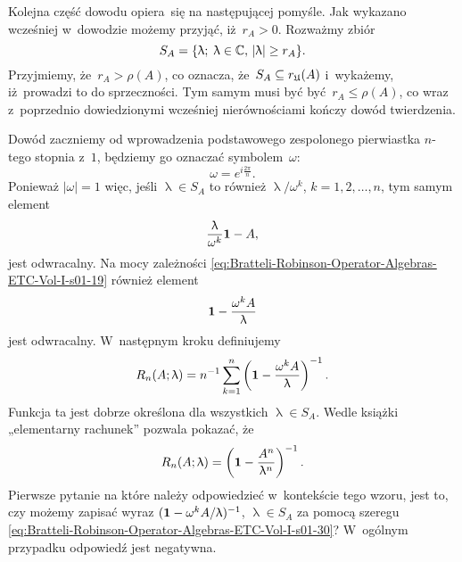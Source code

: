 \documentclass[a4paper,11pt]{article}
\renewcommand{\lambda}{\uplambda}
\begin{document}
Kolejna część dowodu opiera~się na następującej pomyśle. Jak wykazano
wcześniej w~dowodzie możemy przyjąć, iż~$r_{ A } > 0$. Rozważmy zbiór
\begin{equation}
  \label{eq:Bratteli-Robinson-Operator-Algebras-ETC-Vol-I-s01-46}
  S_{ A } =
  \{ \lambda; \; \lambda \in \Cbb, \, | \lambda | \geq r_{ A } \}.
\end{equation}
Przyjmiemy, że~$r_{ A } > \rho( A )$, co oznacza, że~$S_{ A } \subseteq r_{ \mathfrak{U} }( A )$
i~wykażemy, iż~prowadzi to do sprzeczności. Tym samym musi być
być~$r_{ A } \leq \rho( A )$, co wraz z~poprzednio dowiedzionymi wcześniej
nierównościami kończy dowód twierdzenia.

Dowód zaczniemy od wprowadzenia podstawowego zespolonego pierwiastka
$n$-tego stopnia z~$1$, będziemy go oznaczać symbolem~$\omega$:
\begin{equation}
  \label{eq:Bratteli-Robinson-Operator-Algebras-ETC-Vol-I-s01-47}
  \omega = e^{ i \frac{ 2 \pi }{ n } }.
\end{equation}
Ponieważ $| \omega | = 1$ więc, jeśli $\lambda \in S_{ A }$ to również
$\lambda / \omega^{ k }$, $k = 1, 2, \ldots, n$, tym samym element
\begin{equation}
  \label{eq:Bratteli-Robinson-Operator-Algebras-ETC-Vol-I-s01-48}
  \frac{ \lambda }{ \omega^{ k } } \UnitAlg - A,
\end{equation}
jest odwracalny. Na mocy zależności
\eqref{eq:Bratteli-Robinson-Operator-Algebras-ETC-Vol-I-s01-19} również
element
\begin{equation}
  \label{eq:Bratteli-Robinson-Operator-Algebras-ETC-Vol-I-s01-49}
  \UnitAlg - \frac{ \omega^{ k } A }{ \lambda }
\end{equation}
jest odwracalny. W~następnym kroku definiujemy
\begin{equation}
  \label{eq:Bratteli-Robinson-Operator-Algebras-ETC-Vol-I-s01-50}
  R_{ n }( A; \lambda ) =
  n^{ -1 } \sum_{ k = 1 }^{ n } \left( \UnitAlg -
    \frac{ \omega^{ k } A }{ \lambda } \right)^{ -1 }.
\end{equation}
Funkcja ta jest dobrze określona dla wszystkich $\lambda \in S_{ A }$. Wedle książki
„elementarny rachunek” pozwala pokazać, że
\begin{equation}
  \label{eq:Bratteli-Robinson-Operator-Algebras-ETC-Vol-I-s01-51}
  R_{ n }( A; \lambda ) =
  \left( \UnitAlg - \frac{ A^{ n } }{ \lambda^{ n } } \right)^{ -1 }.
\end{equation}
Pierwsze pytanie na które należy odpowiedzieć w~kontekście tego wzoru, jest
to, czy możemy zapisać wyraz $( \UnitAlg - \omega^{ k } A / \lambda )^{ -1 }$,
$\lambda \in S_{ A }$ za pomocą szeregu
\eqref{eq:Bratteli-Robinson-Operator-Algebras-ETC-Vol-I-s01-30}?
W~ogólnym przypadku odpowiedź jest negatywna.
\end{document}
